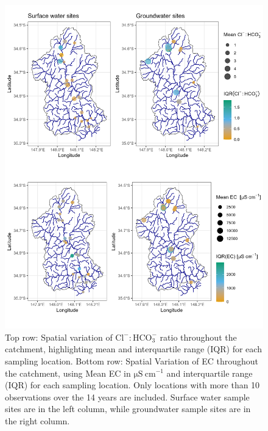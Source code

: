 \documentclass[, manuscript]{copernicus}
\begin{document}
\begin{figure}
\includegraphics[width=0.8\linewidth]{Figures/spatial_maps} \caption{Top row: Spatial variation of $\mathrm{Cl^-:HCO_3^-}$ ratio throughout the catchment, highlighting mean and interquartile range (IQR) for each sampling location. Bottom row: Spatial Variation of EC throughout the catchment, using Mean EC in $\mathrm{\mu S~cm^{-1}}$ and interquartile range (IQR) for each sampling location. Only locations with more than 10 observations over the 14 years are included. Surface water sample sites are in the left column, while groundwater sample sites are in the right column.}\label{fig:spatial-map}
\end{figure}

\clearpage
\end{document}
